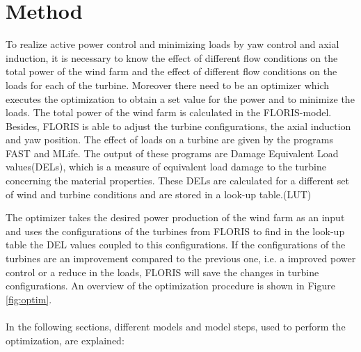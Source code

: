 \section{Method}
\label{sec:method}
	
	To realize active power control and minimizing loads by yaw control and axial induction, it is necessary to know the effect of different flow conditions on the total power of the wind farm and the effect of different flow conditions on the loads for each of the turbine. Moreover there need to be an optimizer which executes the optimization to obtain a set value for the power and to minimize the loads.\newline
	The total power of the wind farm is calculated in the FLORIS-model. Besides, FLORIS is able to adjust the turbine configurations, the axial induction and yaw position.  
	The effect of loads on a turbine are given by the programs FAST and MLife. The output of these programs are Damage Equivalent Load values(DELs), which is a measure of equivalent load damage to the turbine concerning the material properties.\cite{Chougule2016} These DELs are calculated for a different set of wind and turbine conditions and are stored in a look-up table.(LUT)
	
	The optimizer takes the desired power production of the wind farm as an input and uses the configurations of the turbines from FLORIS to find in the look-up table the DEL values coupled to this configurations. If the configurations of the turbines are an improvement compared to the previous one, i.e. a improved power control or a reduce in the loads, FLORIS will save the changes in turbine configurations. An overview of the optimization procedure is shown in Figure \ref{fig:optim}. 
	\\
	\\
	In the following sections, different models and model steps, used to perform the optimization, are explained:
	
	
	
